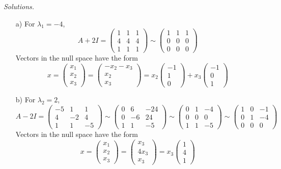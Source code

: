     \ifnum {} {\color{DarkBlue} \textit{Solutions.} 
    \begin{enumerate}
        \item[a)] For $\lambda_1 = -4$, 
        $$A + 2I = \begin{pmatrix} 1&1&1\\4&4&4\\1&1&1\end{pmatrix}\sim\begin{pmatrix} 1&1&1\\0&0&0\\0&0&0\end{pmatrix}$$ Vectors in the null space have the form $$x = \begin{pmatrix}x_1\\x_2\\x_3 \end{pmatrix} = \begin{pmatrix}-x_2-x_3\\x_2\\x_3 \end{pmatrix} = x_2\begin{pmatrix} -1\\1\\0\end{pmatrix} + x_3 \begin{pmatrix} -1\\0\\1\end{pmatrix}$$ 
        \item[b)] For $\lambda_2 = 2$, 
        $$A - 2 I = \begin{pmatrix} -5&1&1\\4&-2&4\\1&1&-5\end{pmatrix}\sim\begin{pmatrix} 0&6&-24\\0&-6&24\\1&1&-5\end{pmatrix}\sim\begin{pmatrix} 0&1&-4\\0&0&0\\1&1&-5\end{pmatrix}\sim\begin{pmatrix} 1&0&-1\\0&1&-4\\0&0&0\end{pmatrix}$$ Vectors in the null space have the form $$x = \begin{pmatrix}x_1\\x_2\\x_3 \end{pmatrix} = \begin{pmatrix} x_3\\ 4 x_3\\ x_3 \end{pmatrix} = x_3 \begin{pmatrix} 1\\ 4\\1

\end{pmatrix}$$
\end{enumerate}}
